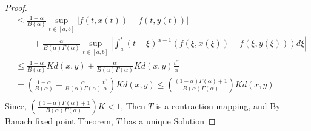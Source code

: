 \documentclass[twoside]{book}
\begin{document}
{\begin{proof}
\begin{align*}
                 & \leq \frac{1-\alpha}{B(\alpha)} \sup_{t \in[a,b]} |f(t,x(t))- f(t,y(t))|                                                                                                                              \\
                 & \qquad + \frac{\alpha}{B(\alpha)\Gamma(\alpha)} \sup_{t \in [a,b]} |\int_a^t (t-\xi)^{\alpha-1} (f(\xi,x(\xi))-f(\xi,y(\xi))) d\xi|                                                                   \\
                 & \leq  \frac{1-\alpha}{B(\alpha)} K d(x,y) + \frac{\alpha}{B(\alpha) \Gamma( \alpha)} K d(x,y) \frac{t^\alpha}{\alpha}                                                                                 \\
                 & = (\frac{1-\alpha}{B(\alpha)} + \frac{\alpha}{B(\alpha)\Gamma(\alpha)} \frac{t^\alpha}{\alpha}) K  d(x,y)   \leq \left(\frac{(1-\alpha)\Gamma(\alpha) +1 }{B(\alpha)\Gamma(\alpha)} \right) K  d(x,y) \\
    \end{align*}
    Since, $ (\frac{(1-\alpha)\Gamma(\alpha) +1 }{B(\alpha)\Gamma(\alpha)}) K < 1 $, Then $T$ is a contraction mapping, and By Banach fixed point Theorem, $T$ has a unique Solution
\end{proof}


}
\end{document}
